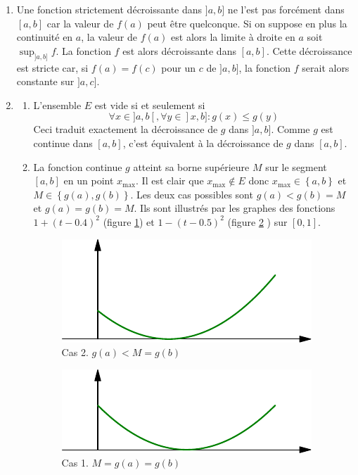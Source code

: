 \begin{enumerate}
Pour une telle fonction, $E = \left] 0,2 \right[$ et contient le maximum local en $0.7$ car ce n'est pas le maximum global de la fonction.

\item Une fonction strictement d{\'e}croissante dans $]a,b]$ ne l'est pas forc{\'e}ment  dans $[a,b] $ car la valeur de $f(a) $ peut {\^e}tre quelconque.
 Si on suppose en plus la continuit{\'e} en $a$, la valeur de $f(a)$ est alors la limite {\`a} droite en $a$ soit $\sup_{] a,b] }f$. La fonction $f$ est alors d{\'e}croissante dans $[ a,b] $.\newline
Cette d{\'e}croissance est stricte car, si $f(a)=f(c)$ pour un $c$ de $] a,b]$, la fonction $f$ serait alors constante sur $]a,c]$.
\item \begin{enumerate}
 \item L'ensemble $E$ est vide si et seulement si
\begin{displaymath}
 \forall x \in ]a,b[ , \forall y \in ]x,b] : g(x)\leq g(y)
\end{displaymath}
Ceci traduit exactement la d{\'e}croissance de $g$ dans $] a,b] $. Comme $g$ est continue dans $[ a,b] $, c'est {\'e}quivalent {\`a} la d{\'e}croissance de $g$ dans $[a,b]$.
\item  La fonction continue $g$ atteint sa borne sup{\'e}rieure $M$ sur le segment $[a,b]$ en un point $x_{\max }$. Il est clair que $x_{\max}\notin E$ donc $x_{\max }\in \left\lbrace a,b\right\rbrace $ et $M\in \left\lbrace g(a),g(b)\right\rbrace$.\newline
Les deux cas possibles sont $g(a)<g(b)=M$ et $g(a)=g(b)=M$.\newline
Ils sont illustr{\'e}s par les graphes des fonctions $1+(t-0.4)^2$ (figure \ref{Clebesg_3}) et $1-(t-0.5)^2$ (figure \ref{Clebesg_4} ) sur $[0,1]$.
\begin{figure}[ht]
\centering
\includegraphics{Clebesg_3.pdf} 
\caption{Cas 2. $g(a)<M=g(b)$}
\label{Clebesg_3}
\end{figure}
\begin{figure}[ht]
\centering
 \includegraphics{Clebesg_4.pdf}
\caption{Cas 1. $M=g(a)=g(b)$}
\label{Clebesg_4}
\end{figure}


\end{enumerate}
\end{enumerate}
